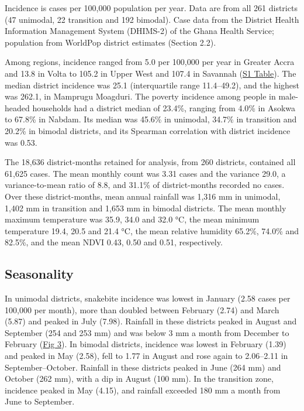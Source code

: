 \documentclass[11pt,a4paper]{article}
\begin{document}
\noindent Incidence is cases per 100,000 population per year. Data are from all 261 districts (47 unimodal, 22 transition and 192 bimodal). Case data from the District Health Information Management System (DHIMS-2) of the Ghana Health Service; population from WorldPop district estimates (Section 2.2).\par\endgroup
\medskip

Among regions, incidence ranged from 5.0 per 100,000 per year in Greater Accra and 13.8 in Volta to 105.2 in Upper West and 107.4 in Savannah (\hyperref[s1table]{S1 Table}). The median district incidence was 25.1 (interquartile range 11.4--49.2), and the highest was 262.1, in Mamprugu Moagduri. The poverty incidence among people in male-headed households had a district median of 23.4\%, ranging from 4.0\% in Asokwa to 67.8\% in Nabdam. Its median was 45.6\% in unimodal, 34.7\% in transition and 20.2\% in bimodal districts, and its Spearman correlation with district incidence was 0.53.

The 18,636 district-months retained for analysis, from 260 districts, contained all 61,625 cases. The mean monthly count was 3.31 cases and the variance 29.0, a variance-to-mean ratio of 8.8, and 31.1\% of district-months recorded no cases. Over these district-months, mean annual rainfall was 1,316 mm in unimodal, 1,402 mm in transition and 1,653 mm in bimodal districts. The mean monthly maximum temperature was 35.9, 34.0 and 32.0 °C, the mean minimum temperature 19.4, 20.5 and 21.4 °C, the mean relative humidity 65.2\%, 74.0\% and 82.5\%, and the mean NDVI 0.43, 0.50 and 0.51, respectively.

\subsection{Seasonality}

In unimodal districts, snakebite incidence was lowest in January (2.58 cases per 100,000 per month), more than doubled between February (2.74) and March (5.87) and peaked in July (7.98). Rainfall in these districts peaked in August and September (254 and 253 mm) and was below 3 mm a month from December to February (\hyperref[fig3]{Fig 3}). In bimodal districts, incidence was lowest in February (1.39) and peaked in May (2.58), fell to 1.77 in August and rose again to 2.06--2.11 in September--October. Rainfall in these districts peaked in June (264 mm) and October (262 mm), with a dip in August (100 mm). In the transition zone, incidence peaked in May (4.15), and rainfall exceeded 180 mm a month from June to September.
\end{document}
